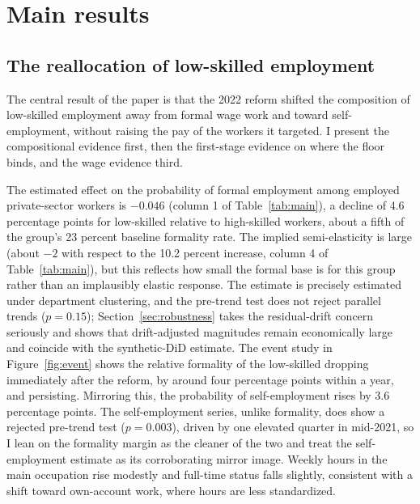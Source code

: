 \section{Main results}\label{sec:results}

\subsection{The reallocation of low-skilled employment}

The central result of the paper is that the 2022 reform shifted the composition of
low-skilled employment away from formal wage work and toward self-employment, without
raising the pay of the workers it targeted. I present the compositional evidence first, then the
first-stage evidence on where the floor binds, and the wage evidence third.

The estimated effect on the probability of formal employment among employed
private-sector workers is $-0.046$ (column 1 of Table~\ref{tab:main}), a decline of 4.6
percentage points for low-skilled relative to high-skilled workers, about a fifth of the
group's 23 percent baseline formality rate. The implied semi-elasticity is large (about
$-2$ with respect to the 10.2 percent increase, column 4 of Table~\ref{tab:main}), but
this reflects how small the formal base is for this group rather than an implausibly
elastic response. The estimate is precisely estimated under
department clustering, and the pre-trend test does not reject parallel trends
($p=0.15$); Section~\ref{sec:robustness} takes the residual-drift concern seriously and
shows that drift-adjusted magnitudes remain economically large and coincide with the
synthetic-DiD estimate.
The event study in Figure~\ref{fig:event} shows the relative formality of the low-skilled
dropping immediately after the reform, by around four percentage points within a year,
and persisting. Mirroring this, the probability of self-employment rises by 3.6
percentage points. The self-employment series, unlike formality, does show a rejected
pre-trend test ($p=0.003$), driven by one elevated quarter in mid-2021, so I lean on the
formality margin as the cleaner of the two and treat the self-employment estimate as its
corroborating mirror image. Weekly hours in the main occupation rise modestly and
full-time status falls slightly, consistent with a shift toward own-account work, where
hours are less standardized.

